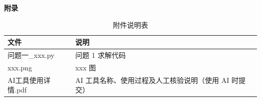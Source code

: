 \newpage
\appendix
\begin{center}
	{\bfseries 附录}
\end{center}

\begin{table}[htbp]
	\caption{附件说明表}
	\centering
	\begin{tabularx}{0.9\textwidth}{lX}
		\toprule
		文件 & 说明 \\
		\midrule
		问题一\_xxx.py & 问题 1 求解代码 \\
		xxx.png & xxx 图 \\
		AI工具使用详情.pdf & AI 工具名称、使用过程及人工核验说明（使用 AI 时提交） \\
		\bottomrule
	\end{tabularx}
\end{table}
